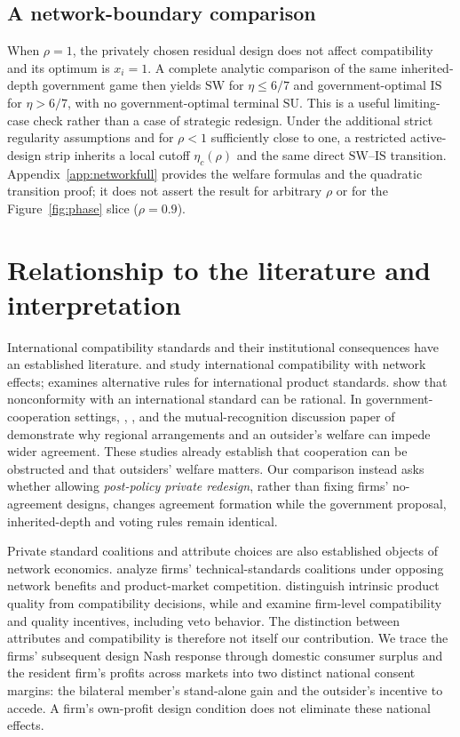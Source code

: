 \documentclass[11pt,a4paper]{article}
\theoremstyle{remark}\newtheorem{remark}[theorem]{Remark}
\newcommand{\SW}{\mathrm{SW}}\newcommand{\SU}{\mathrm{SU}}\newcommand{\IS}{\mathrm{IS}}
\begin{document}
\subsection{A network-boundary comparison}
When $\rho=1$, the privately chosen residual design does not affect compatibility and its optimum is $x_i=1$. A complete analytic comparison of the same inherited-depth government game then yields $\SW$ for $\eta\le6/7$ and government-optimal $\IS$ for $\eta>6/7$, with no government-optimal terminal $\SU$. This is a useful limiting-case check rather than a case of strategic redesign. Under the additional strict regularity assumptions and for $\rho<1$ sufficiently close to one, a restricted active-design strip inherits a local cutoff $\eta_c(\rho)$ and the same direct $\SW$--$\IS$ transition. Appendix~\ref{app:networkfull} provides the welfare formulas and the quadratic transition proof; it does not assert the result for arbitrary $\rho$ or for the Figure~\ref{fig:phase} slice ($\rho=0.9$).

\section{Relationship to the literature and interpretation}\label{sec:literature}
International compatibility standards and their institutional consequences have an established literature. \citet{GandalShy2001} and \citet{Klimenko2009} study international compatibility with network effects; \citet{Costinot2008} examines alternative rules for international product standards. \citet{BarrettYang2001} show that nonconformity with an international standard can be rational. In government-cooperation settings, \citet{Takarada2020}, \citet{Kawabata2021}, and the mutual-recognition discussion paper of \citet{TakaradaKawabata2025} demonstrate why regional arrangements and an outsider's welfare can impede wider agreement. These studies already establish that cooperation can be obstructed and that outsiders' welfare matters. Our comparison instead asks whether allowing \emph{post-policy private redesign}, rather than fixing firms' no-agreement designs, changes agreement formation while the government proposal, inherited-depth and voting rules remain identical.

Private standard coalitions and attribute choices are also established objects of network economics. \citet{EconomidesFlyer1998} analyze firms' technical-standards coalitions under opposing network benefits and product-market competition. \citet{BaakeBoom2001} distinguish intrinsic product quality from compatibility decisions, while \citet{Buccella2023} and \citet{Cheng2025} examine firm-level compatibility and quality incentives, including veto behavior. The distinction between attributes and compatibility is therefore not itself our contribution. We trace the firms' subsequent design Nash response through domestic consumer surplus and the resident firm's profits across markets into two distinct national consent margins: the bilateral member's stand-alone gain and the outsider's incentive to accede. A firm's own-profit design condition does not eliminate these national effects.
\end{document}
